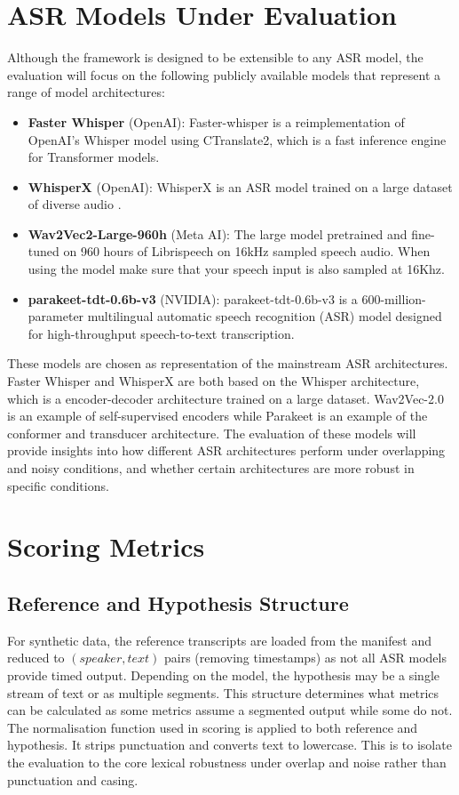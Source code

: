 \section{ASR Models Under Evaluation}
Although the framework is designed to be extensible to any ASR model, the evaluation will focus on the following publicly available models that represent a range of model architectures:
\begin{itemize}
    \item \textbf{Faster Whisper} (OpenAI): Faster-whisper is a reimplementation of OpenAI's Whisper model using CTranslate2, which is a fast inference engine for Transformer models. \cite{github_openai_faster-whisper}
    \item \textbf{WhisperX} (OpenAI): WhisperX is an ASR model trained on a large dataset of diverse audio \cite{bain2026whisperx_repo}.
    \item \textbf{Wav2Vec2-Large-960h} (Meta AI): The large model pretrained and fine-tuned on 960 hours of Librispeech on 16kHz sampled speech audio. When using the model make sure that your speech input is also sampled at 16Khz. \cite{facebook_wav2vec2-large-960h}
    \item \textbf{parakeet-tdt-0.6b-v3} (NVIDIA): parakeet-tdt-0.6b-v3 is a 600-million-parameter multilingual automatic speech recognition (ASR) model designed for high-throughput speech-to-text transcription. \cite{nvidia/parakeet-tdt-0.6b-v3}
    
\end{itemize}
These models are chosen as representation of the mainstream ASR architectures. Faster Whisper and WhisperX are both based on the Whisper architecture, which is a encoder-decoder architecture trained on a large dataset. Wav2Vec-2.0 is an example of self-supervised encoders while Parakeet is an example of the conformer and transducer architecture. The evaluation of these models will provide insights into how different ASR architectures perform under overlapping and noisy conditions, and whether certain architectures are more robust in specific conditions.

\section{Scoring Metrics}
\subsection{Reference and Hypothesis Structure}
For synthetic data, the reference transcripts are loaded from the manifest and reduced to $(speaker, text)$ pairs (removing timestamps) as not all ASR models provide timed output. Depending on the model, the hypothesis may be a single stream of text or as multiple segments. This structure determines what metrics can be calculated as some metrics assume a segmented output while some do not. The normalisation function used in scoring is applied to both reference and hypothesis. It strips punctuation and converts text to lowercase. This is to isolate the evaluation to the core lexical robustness under overlap and noise rather than punctuation and casing.

